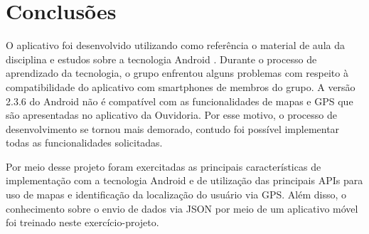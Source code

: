 \chapter{Conclusões}
\label{cap:conclusoes}

O aplicativo foi desenvolvido utilizando como referência o material de aula da disciplina e estudos sobre a tecnologia Android \cite{Android:2014}. Durante o processo de aprendizado da tecnologia, o grupo enfrentou alguns problemas com respeito à compatibilidade do aplicativo com smartphones de membros do grupo. A versão 2.3.6 do Android não é compatível com as funcionalidades de mapas e GPS que são apresentadas no aplicativo da Ouvidoria. Por esse motivo, o processo de desenvolvimento se tornou mais demorado, contudo foi possível implementar todas as funcionalidades solicitadas.

Por meio desse projeto foram exercitadas as principais características de implementação com a tecnologia Android e de utilização das principais APIs para uso de mapas e identificação da localização do usuário via GPS. Além disso, o conhecimento sobre o envio de dados via JSON por meio de um aplicativo móvel foi treinado neste exercício-projeto.



